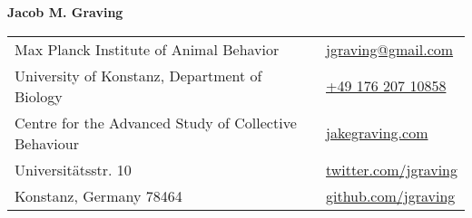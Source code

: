 \documentclass[letterpaper,6pt,oneside]{article}
\begin{document}

\LARGE{\textbf{Jacob M. Graving}}  \\
\normalsize



\begin{center}
\begin{tabular}{l l}
 Max Planck Institute of Animal Behavior		& \hspace{2in} \href{mailto:jgraving@gmail.com}{\faEnvelope{ } jgraving@gmail.com} \\
 University of Konstanz, Department of Biology	& \hspace{2in}   \href{tel:+4917620710858 }{\faPhone{ } +49 176 207 10858 }  \\
  Centre for the Advanced Study of Collective Behaviour    & \hspace{2in}  \href{http://jakegraving.com/}{\faGlobe{ } jakegraving.com}   \\
  Universit\"{a}tsstr. 10  & \hspace{2in}  \href{https://twitter.com/jgraving}{\faTwitter{ }  twitter.com/jgraving}   \\
   Konstanz, Germany 78464         & \hspace{2in} \href{https://github.com/jgraving}{\faGithub{ }  github.com/jgraving} \\
 
\end{tabular}
\end{center}
\end{document}
